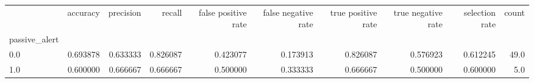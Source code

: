 \begin{tabular}{lrrrrrrrrr}
\toprule
{} &  accuracy &  precision &    recall &  false positive rate &  false negative rate &  true positive rate &  true negative rate &  selection rate &  count \\
passive\_alert &           &            &           &                      &                      &                     &                     &                 &        \\
\midrule
0.0           &  0.693878 &   0.633333 &  0.826087 &             0.423077 &             0.173913 &            0.826087 &            0.576923 &        0.612245 &   49.0 \\
1.0           &  0.600000 &   0.666667 &  0.666667 &             0.500000 &             0.333333 &            0.666667 &            0.500000 &        0.600000 &    5.0 \\
\bottomrule
\end{tabular}
